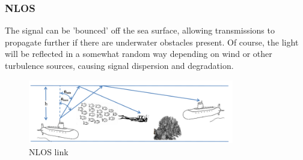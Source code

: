 \subsubsection{\ac{NLOS}}
The signal can be 'bounced' off the sea surface, allowing transmissions to
propagate further if there are underwater obstacles present. Of course, the
light will be reflected in a somewhat random way depending on wind or other
turbulence sources, causing signal dispersion and degradation.

\begin{figure}[H]
  \includegraphics[width=0.8\textwidth]{nlos-link.png}
  \caption{\ac{NLOS} link \cite{kaushal_kaddoum}}
  \label{fig:nlos-link}
\end{figure}

